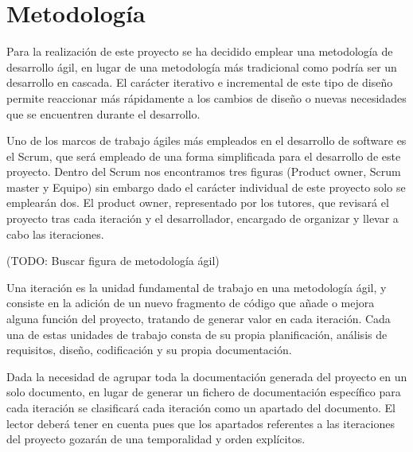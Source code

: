 \section{Metodología}

    Para la realización de este proyecto se ha decidido emplear una metodología de desarrollo ágil, en lugar de una metodología más tradicional como podría ser un desarrollo en cascada. El carácter iterativo e incremental de este tipo de diseño permite reaccionar más rápidamente a los cambios de diseño o nuevas necesidades que se encuentren durante el desarrollo.

    Uno de los marcos de trabajo ágiles más empleados en el desarrollo de software es el Scrum, que será empleado de una forma simplificada para el desarrollo de este proyecto. Dentro del Scrum nos encontramos tres figuras (Product owner, Scrum master y Equipo) sin embargo dado el carácter individual de este proyecto solo se emplearán dos. El product owner, representado por los tutores, que revisará el proyecto tras cada iteración y el desarrollador, encargado de organizar y  llevar a cabo las iteraciones.

    (TODO: Buscar figura de metodología ágil)

    Una iteración es la unidad fundamental de trabajo en una metodología ágil, y consiste en la adición de un nuevo fragmento de código que añade o mejora alguna función del proyecto, tratando de generar valor en cada iteración. Cada una de estas unidades de trabajo consta de su propia planificación, análisis de requisitos, diseño, codificación y su propia documentación.

    Dada la necesidad de agrupar toda la documentación generada del proyecto en un solo documento, en lugar de generar un fichero de documentación específico para cada iteración se clasificará cada iteración como un apartado del documento. El lector deberá tener en cuenta pues que los apartados referentes a las iteraciones del proyecto gozarán de una temporalidad y orden explícitos.

\clearpage

\chapterend{}

